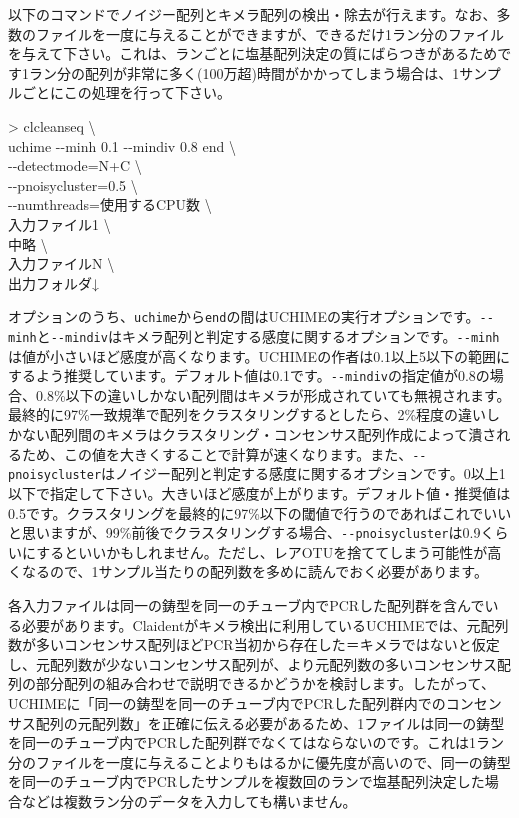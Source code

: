 \documentclass[titlepage,10pt,a4paper]{jsbook}
\newenvironment{cmd}{\begin{oframed}\raggedright\ttfamily\footnotesize\setlength{\baselineskip}{1.4em}}{\end{oframed}\vspace{-1em}}
\begin{document}
以下のコマンドでノイジー配列とキメラ配列の検出・除去が行えます。なお、多数のファイルを一度に与えることができますが、できるだけ1ラン分のファイルを与えて下さい。これは、ランごとに塩基配列決定の質にばらつきがあるためです1ラン分の配列が非常に多く(100万超)時間がかかってしまう場合は、1サンプルごとにこの処理を行って下さい。
\begin{cmd}
{\textgreater} clcleanseq {\textbackslash}\\
uchime {-}{-}minh 0.1 {-}{-}mindiv 0.8 end {\textbackslash}\\
{-}{-}detectmode=N+C {\textbackslash}\\
{-}{-}pnoisycluster=0.5 {\textbackslash}\\
{-}{-}numthreads=使用するCPU数 {\textbackslash}\\
入力ファイル1 {\textbackslash}\\
中略 {\textbackslash}\\
入力ファイルN {\textbackslash}\\
出力フォルダ↓
\end{cmd}
オプションのうち、\texttt{uchime}から\texttt{end}の間はUCHIMEの実行オプションです。\texttt{{-}{-}minh}と\texttt{{-}{-}mindiv}はキメラ配列と判定する感度に関するオプションです。\texttt{{-}{-}minh}は値が小さいほど感度が高くなります。UCHIMEの作者は0.1以上5以下の範囲にするよう推奨しています。デフォルト値は0.1です。\texttt{{-}{-}mindiv}の指定値が0.8の場合、0.8\%以下の違いしかない配列間はキメラが形成されていても無視されます。最終的に97\%一致規準で配列をクラスタリングするとしたら、2\%程度の違いしかない配列間のキメラはクラスタリング・コンセンサス配列作成によって潰されるため、この値を大きくすることで計算が速くなります。また、\texttt{{-}{-}pnoisycluster}はノイジー配列と判定する感度に関するオプションです。0以上1以下で指定して下さい。大きいほど感度が上がります。デフォルト値・推奨値は0.5です。クラスタリングを最終的に97\%以下の閾値で行うのであればこれでいいと思いますが、99\%前後でクラスタリングする場合、\texttt{{-}{-}pnoisycluster}は0.9くらいにするといいかもしれません。ただし、レアOTUを捨ててしまう可能性が高くなるので、1サンプル当たりの配列数を多めに読んでおく必要があります。

各入力ファイルは同一の鋳型を同一のチューブ内でPCRした配列群を含んでいる必要があります。Claidentがキメラ検出に利用しているUCHIMEでは、元配列数が多いコンセンサス配列ほどPCR当初から存在した＝キメラではないと仮定し、元配列数が少ないコンセンサス配列が、より元配列数の多いコンセンサス配列の部分配列の組み合わせで説明できるかどうかを検討します。したがって、UCHIMEに「同一の鋳型を同一のチューブ内でPCRした配列群内でのコンセンサス配列の元配列数」を正確に伝える必要があるため、1ファイルは同一の鋳型を同一のチューブ内でPCRした配列群でなくてはならないのです。これは1ラン分のファイルを一度に与えることよりもはるかに優先度が高いので、同一の鋳型を同一のチューブ内でPCRしたサンプルを複数回のランで塩基配列決定した場合などは複数ラン分のデータを入力しても構いません。
\end{document}
